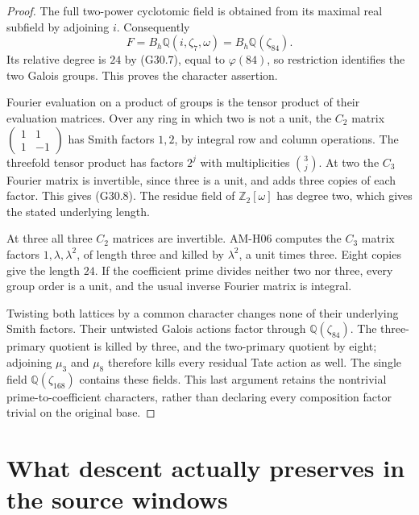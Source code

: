 \begin{proof}
The full two-power cyclotomic field is obtained from its
maximal real subfield by adjoining $i$.  Consequently
\[
 F=B_h\mathbb Q(i,\zeta_7,\omega)
                  =B_h\mathbb Q(\zeta_{84}).
\]
Its relative degree is $24$ by (G30.7), equal to
$\varphi(84)$, so restriction identifies the two Galois
groups.  This proves the character assertion.

Fourier evaluation on a product of groups is the tensor
product of their evaluation matrices.  Over any ring in
which two is not a unit, the $C_2$ matrix
$\left(\begin{smallmatrix}1&1\\1&-1\end{smallmatrix}\right)$
has Smith factors $1,2$, by integral row and column
operations.  The threefold tensor product has factors
$2^j$ with multiplicities $\binom3j$.  At two the $C_3$
Fourier matrix is invertible, since three is a unit, and
adds three copies of each factor.  This gives (G30.8).
The residue field of $\mathbb Z_2[\omega]$ has degree two,
which gives the stated underlying length.

At three all three $C_2$ matrices are invertible.
AM-H06 computes the $C_3$ matrix factors
$1,\lambda,\lambda^2$, of length three and killed by
$\lambda^2$, a unit times three.  Eight copies give the
length $24$.  If the coefficient prime divides neither
two nor three, every group order is a unit, and the usual
inverse Fourier matrix is integral.

Twisting both lattices by a common character changes
none of their underlying Smith factors.  Their untwisted
Galois actions factor through $\mathbb Q(\zeta_{84})$.
The three-primary quotient is killed by three, and the
two-primary quotient by eight; adjoining $\mu_3$ and
$\mu_8$ therefore kills every residual Tate action as
well.  The single field $\mathbb Q(\zeta_{168})$ contains
these fields.  This last argument retains the nontrivial
prime-to-coefficient characters, rather than declaring
every composition factor trivial on the original base.
\end{proof}

\section{What descent actually preserves in the source windows}
\label{sec:finite-window-descent}

